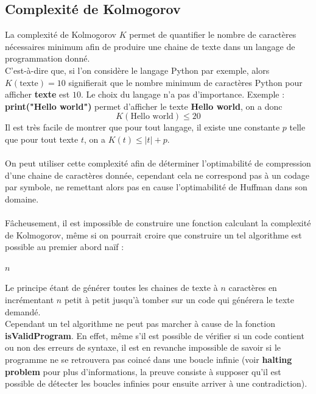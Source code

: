 \documentclass[a4paper, 12pt]{article}
\begin{document}
\subsection{Complexité de Kolmogorov}
La complexité de Kolmogorov $K$ permet de quantifier le nombre de caractères nécessaires minimum afin de produire une chaine de texte dans un langage de programmation donné. \\
C'est-à-dire que, si l'on considère le langage Python par exemple, alors $K(\text{texte}) = 10$ signifierait que le nombre minimum de caractères Python pour afficher \textbf{texte} est $10$.
Le choix du langage n'a pas d'importance.
Exemple : \\
\textbf{print("Hello world")} permet d'afficher le texte \textbf{Hello world}, on a donc
$$
K(\text{Hello world}) \leq 20
$$
Il est très facile de montrer que pour tout langage, il existe une constante $p$ telle que pour tout texte $t$, on a $K(t) \leq |t|+p$. \\ \\
On peut utiliser cette complexité afin de déterminer l'optimabilité de compression d'une chaine de caractères donnée, cependant cela ne correspond pas à un codage par symbole, ne remettant alors pas en cause l'optimabilité de Huffman dans son domaine. \\ \\
Fâcheusement, il est impossible de construire une fonction calculant la complexité de Kolmogorov, même si on pourrait croire que construire un tel algorithme est possible au premier abord naïf : \\

\begin{algorithm}
\begin{algorithmic}[1]
\State \Return $n$
\EndIf
\EndFor
\EndFor
\EndFunction
\end{algorithmic}
\end{algorithm}

Le principe étant de générer toutes les chaines de texte à $n$ caractères en incrémentant $n$ petit à petit jusqu'à tomber sur un code qui générera le texte demandé. \\
Cependant un tel algorithme ne peut pas marcher à cause de la fonction \textbf{isValidProgram}. En effet, même s'il est possible de vérifier si un code contient ou non des erreurs de syntaxe, il est en revanche impossible de savoir si le programme ne se retrouvera pas coincé dans une boucle infinie (voir \textbf{halting problem} pour plus d'informations, la preuve consiste à supposer qu'il est possible de détecter les boucles infinies pour ensuite arriver à une contradiction). \\
\end{document}
